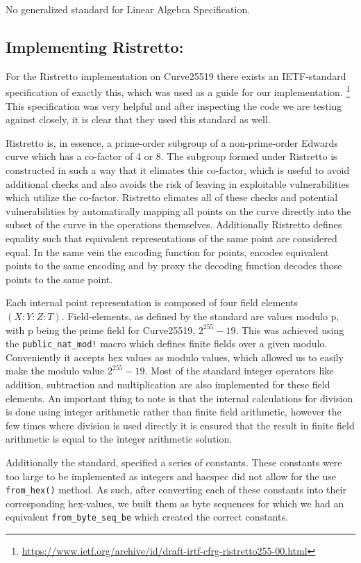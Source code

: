 \documentclass{article}
\begin{document}
No generalized standard for Linear Algebra Specification.

\subsection{Implementing Ristretto:} \label{implementing-ristretto}

For the Ristretto implementation on Curve25519 there
exists an IETF-standard specification of exactly
this, which was used as a guide for our implementation.
\footnote{\url{https://www.ietf.org/archive/id/draft-irtf-cfrg-ristretto255-00.html}}
This specification was very helpful and after inspecting the code we
are testing against closely, it is clear that they used this standard
as well.

Ristretto is, in essence, a prime-order subgroup of a non-prime-order Edwards curve which has a co-factor of 4 or 8. The subgroup formed under Ristretto is constructed in such a way that it elimates this co-factor, which is useful to avoid additional checks and also avoids the risk of leaving in exploitable vulnerabilities which utilize the co-factor. Ristretto elimates all of these checks and potential vulnerabilities by automatically mapping all points on the curve directly into the subset of the curve in the operations themselves. Additionally Ristretto defines equality such that equivalent representations of the same point are considered equal. In the same vein the encoding function for points, encodes equivalent points to the same encoding and by proxy the decoding function decodes those points to the same point.

Each internal point representation is composed of four field elements $(X : Y : Z : T)$. Field-elements, as defined by the standard are values modulo p, with p being the prime field for Curve25519, $2^{255} - 19$. This was achieved using the \texttt{public\_nat\_mod!} macro which defines finite fields over a given modulo. Conveniently it accepts hex values as modulo values, which allowed us to easily make the modulo value $2^{255} - 19$. Most of the standard integer operators like addition, subtraction and multiplication are also implemented for these field elements. An important thing to note is that the internal calculations for division is done using integer arithmetic rather than finite field arithmetic, however the few times where division is used directly it is ensured that the result in finite field arithmetic is equal to the integer arithmetic solution.

Additionally the standard, specified a series of constants. These constants were too large to be implemented as integers and hacspec did not allow for the use \texttt{from\_hex()} method. As such, after converting each of these constants into their corresponding hex-values, we built them as byte sequences for which we had an equivalent \texttt{from\_byte\_seq\_be} which created the correct constants.
\end{document}
